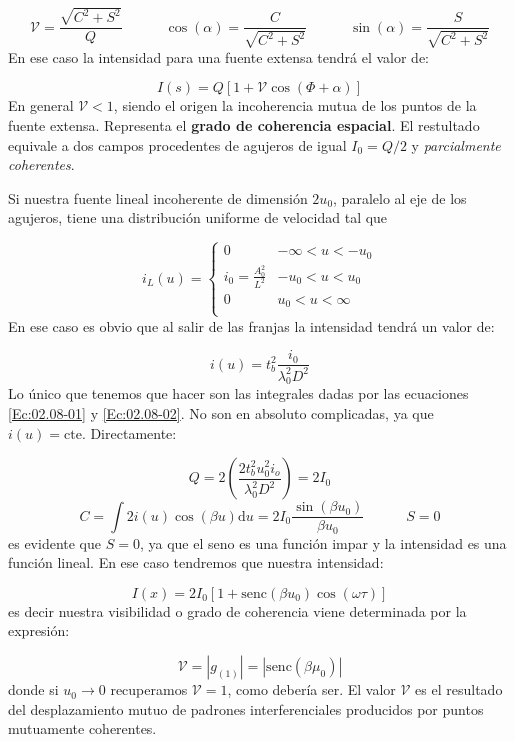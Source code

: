 \documentclass[12pt,a4paper]{book}
\numberwithin{equation}{section}
\numberwithin{figure}{section}
\newcommand{\tquad}{\quad \quad \quad}
\newcommand{\parentesis}[1]{\left( #1  \right)}
\newcommand{\ccorchetes}[1]{\left[ #1  \right]}
\newcommand{\D}{\mathrm{d}}
\newcommand{\cte}{\mathrm{cte}}
\newcommand{\1}{_{(1)}}
\newcommand{\2}{_{(2)}}
\theoremstyle{definition}
\begin{document}
\begin{equation}
\mathcal{V} = \dfrac{\sqrt{C^2+S^2}}{Q} \tquad \cos (\alpha)=\frac{C}{\sqrt{C^2+S^2}} \tquad \sin (\alpha) = \frac{S}{\sqrt{C^2+S^2}}
\end{equation}
En ese caso la intensidad para una fuente extensa tendrá el valor de:

\begin{equation}
I(s) = Q [1 + \mathcal{V} \cos (\Phi + \alpha)]
\end{equation}
En general $\mathcal{V}<1$, siendo el origen la incoherencia mutua de los puntos de la fuente extensa. Representa el \textbf{grado de coherencia espacial}. El restultado equivale a dos campos procedentes de agujeros de igual $I_0=Q/2$ y \textit{parcialmente coherentes}. \\


\hrulefill

Si nuestra fuente lineal incoherente de dimensión $2u_0$, paralelo al eje de los agujeros, tiene una distribución uniforme de velocidad tal que

$$ i_L (u) = \left\lbrace 
\begin{array}{lc}
0 & - \infty < u < -u_0 \\
i_0 = \frac{A_0^2}{L^2} & -u_0 < u < u_0 \\
0  & u_0 < u < \infty \\
\end{array}
\right. $$
En ese caso es obvio que al salir de las franjas la intensidad tendrá un valor de:

$$ i (u) = t_b^2 \frac{i_0}{\lambda_0^2 D^2} $$
Lo único que tenemos que hacer son las integrales dadas por las ecuaciones \ref{Ec:02.08-01} y \ref{Ec:02.08-02}. No son en absoluto complicadas, ya que $i(u) = \cte$. Directamente:

$$Q = 2  \parentesis{\frac{2t_b^2 u_0^2 i_o}{\lambda_0^2 D^2}} =2 I_0$$
$$C  = \int 2 i(u) \cos (\beta u) \D u = 2 I_0 \frac{\sin (\beta u_0)}{\beta u_0} \tquad S = 0 $$
es evidente que $S=0$, ya que el seno es una función impar y la intensidad es una función lineal. En ese caso tendremos que nuestra intensidad:

$$ I(x) = 2I_0 \ccorchetes{1+\mathrm{senc} (\beta u_0) \cos (\omega \tau)} $$
es decir nuestra visibilidad o grado de coherencia viene determinada por la expresión:

$$ \mathcal{V} = |g\1|=|\mathrm{senc} (\beta \mu_0)| $$
donde si $u_0\rightarrow 0$ recuperamos $\mathcal{V}=1$, como debería ser. El valor $\mathcal{V}$ es el resultado del desplazamiento mutuo de padrones interferenciales producidos por puntos mutuamente coherentes.
\end{document}
